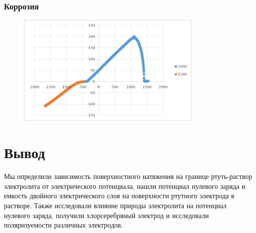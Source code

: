 \documentclass[a4paper, 12pt]{article}
\begin{document}
\newpage

\subsubsection*{Коррозия}


\begin{figure}[h!]
	\centering
	\caption{}	\includegraphics[width=0.8\textwidth]{image017.png}
\end{figure}

\newpage
\section{Вывод}
Мы определили зависимость поверхностного натяжения на границе ртуть-раствор электролита от электрического потенциала, нашли потенциал нулевого заряда и емкость двойного электрического слоя на поверхности ртутного электрода в растворе. Также исследовали влияние природы электролита на потенциал нулевого заряда, получили хлорсеребряный электрод и исследовали поляризуемости различных электродов.
\end{document}
